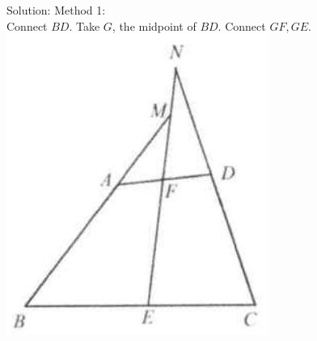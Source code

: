 \documentclass[10pt]{article}
\begin{document}
Solution:
Method 1:\\
Connect \(B D\). Take \(G\), the midpoint of \(B D\). Connect \(G F, G E\).\\
\includegraphics[max width=\textwidth, center]{2025_04_17_97bc1f7e44d93c271a88g-042(2)}
\end{document}
